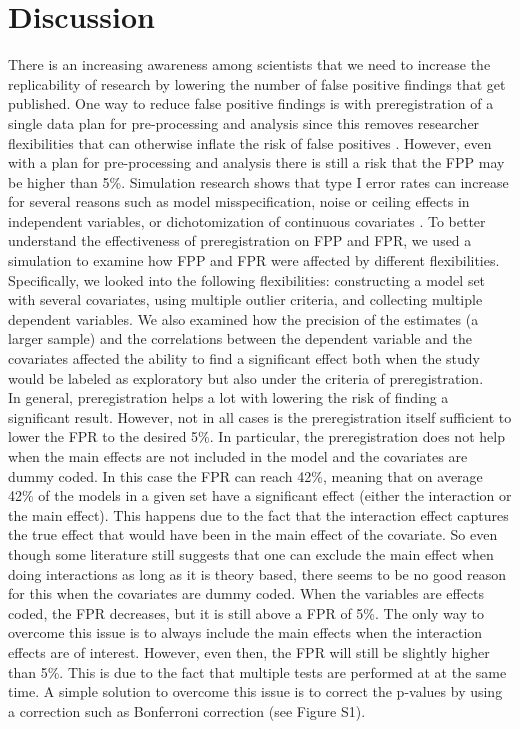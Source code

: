 \section{Discussion}
There is an increasing awareness among scientists that we need to increase the replicability of research by lowering the number of false positive findings that get published. One way to reduce false positive findings is with preregistration of a single data plan for pre-processing and analysis since this removes researcher flexibilities that can otherwise inflate the risk of false positives \citep{Simmons2011}. However, even with a plan for pre-processing and analysis there is still a risk that the FPP may be higher than 5\%. Simulation research shows that type I error rates can increase for several reasons such as model misspecification, noise or ceiling effects in independent variables, or dichotomization of continuous covariates \citep{Dennis2019, Litiere2007, Brunner2009, Austin2003, Austin2004}. To better understand the effectiveness of preregistration on FPP and FPR, we used a simulation to examine how FPP and FPR were affected by different flexibilities. Specifically, we looked into the following flexibilities: constructing a model set with several covariates, using multiple outlier criteria, and collecting multiple dependent variables. We also examined how the precision of the estimates (a larger sample) and the correlations between the dependent variable and the covariates affected the ability to find a significant effect both when the study would be labeled as exploratory but also under the criteria of preregistration. \\

In general, preregistration helps a lot with lowering the risk of finding a significant result. However, not in all cases is the preregistration itself sufficient to lower the FPR to the desired 5\%. In particular, the preregistration does not help when the main effects are not included in the model and the covariates are dummy coded. In this case the FPR can reach 42\%, meaning that on average 42\% of the models in a given set have a significant effect (either the interaction or the main effect). This happens due to the fact that the interaction effect captures the true effect that would have been in the main effect of the covariate. So even though some literature still suggests that one can exclude the main effect when doing interactions as long as it is theory based, there seems to be no good reason for this when the covariates are dummy coded. When the variables are effects coded, the FPR decreases, but it is still above a FPR of 5\%. The only way to overcome this issue is to always include the main effects when the interaction effects are of interest. However, even then, the FPR will still be slightly higher than 5\%. This is due to the fact that multiple tests are performed at at the same time. A simple solution to overcome this issue is to correct the p-values by  using a correction such as Bonferroni correction \citep{dunn1961multiple} (see Figure S1).  \\

